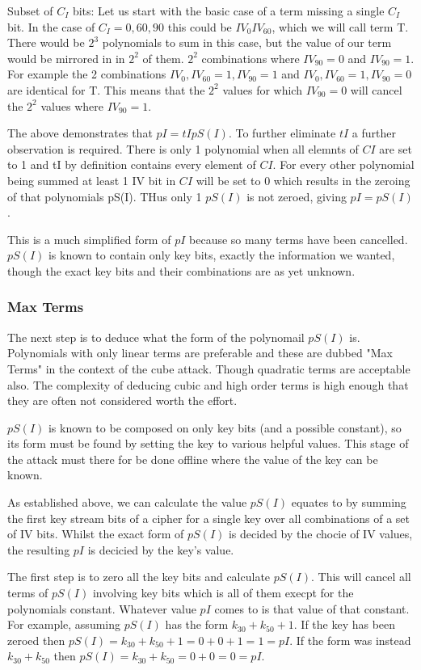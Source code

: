 \documentclass{report}
\begin{document}
Subset of $C_I$ bits:
Let us start with the basic case of a term missing a single $C_I$ bit. In the case of $C_I={0, 60, 90}$ this could be $IV_0IV_{60}$, which we will call term T. There would be $2^3$ polynomials to sum in this case, but the value of our term would be mirrored in in $2^2$ of them. $2^2$ combinations where $IV_{90}=0$ and $IV_{90}=1$. For example the 2 combinations $IV_0, IV_{60}=1, IV_{90}=1$ and $IV_0, IV_{60}=1, IV_{90}=0$ are identical for T. This means that the $2^2$ values for which $IV_{90}=0$ will cancel the $2^2$ values where $IV_{90}=1$.

The above demonstrates that $pI=tIpS(I)$. To further eliminate $tI$ a further observation is required. There is only 1 polynomial when all elemnts of $CI$ are set to 1 and tI by definition contains every element of $CI$. For every other polynomial being summed at least 1 IV bit in $CI$ will be set to 0 which results in the zeroing of that polynomials pS(I). THus only 1 $pS(I)$ is not zeroed, giving $pI=pS(I)$.

This is a much simplified form of $pI$ because so many terms have been cancelled. $pS(I)$ is known to contain only key bits, exactly the information we wanted, though the exact key bits and their combinations are as yet unknown.

\subsubsection{Max Terms}
The next step is to deduce what the form of the polynomail $pS(I)$ is. Polynomials with only linear terms are preferable and these are dubbed "Max Terms" in the context of the cube attack. Though quadratic terms are acceptable also. The complexity of deducing cubic and high order terms is high enough that they are often not considered worth the effort.%

$pS(I)$ is known to be composed on only key bits (and a possible constant), so its form must be found by setting the key to various helpful values. This stage of the attack must there for be done offline where the value of the key can be known.

As established above, we can calculate the value $pS(I)$ equates to by summing the first key stream bits of a cipher for a single key over all combinations of a set of IV bits. Whilst the exact form of $pS(I)$ is decided by the chocie of IV values, the resulting $pI$ is decicied by the key's value.

The first step is to zero all the key bits and calculate $pS(I)$. This will cancel all terms of $pS(I)$ involving key bits which is all of them execpt for the polynomials constant. Whatever value $pI$ comes to is that value of that constant. For example, assuming $pS(I)$ has the form $k_{30}+k_{50}+1$. If the key has been zeroed then $pS(I)=k_{30}+k_{50}+1=0+0+1=1=pI$. If the form was instead $k_{30}+k_{50}$ then $pS(I)=k_{30}+k_{50}=0+0=0=pI$.
\end{document}
